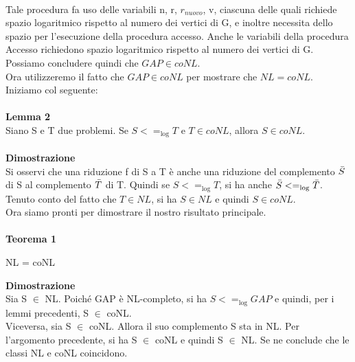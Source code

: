 \\Tale procedura fa uso delle variabili n, r, $r_{nuovo}$, v, ciascuna delle quali richiede spazio logaritmico rispetto al numero dei vertici di G, e inoltre necessita dello spazio per l’esecuzione della procedura accesso. Anche le variabili della procedura Accesso richiedono spazio logaritmico rispetto al numero dei vertici di G. Possiamo concludere quindi che $GAP \in coNL$.
\\Ora utilizzeremo il fatto che $GAP \in coNL$ per mostrare che $NL = coNL$. \\Iniziamo col seguente:\\\\
\textbf{Lemma 2}\\
Siano S e T due problemi. Se $S <=_{\log} T$ e $T \in coNL$, allora $S \in coNL$.\\\\
\textbf{Dimostrazione}\\    
Si osservi che una riduzione f di S a T è anche una riduzione del complemento $\Bar{S}$ di S al complemento $\Bar{T}$ di T. Quindi se $S <=_{\log}T$, si ha anche $\Bar{S} <=_{\log}\Bar{T}$.
\\Tenuto conto del fatto che $T \in NL$, si ha $S \in NL$ e quindi $S \in coNL$.
\\Ora siamo pronti per dimostrare il nostro risultato principale.\\\\
\textbf{Teorema 1}
\begin{center}
    NL = coNL
\end{center}
\textbf{Dimostrazione}\\
Sia S $\in$ NL. Poiché GAP è NL-completo, si ha $S <=_{\log} GAP$ e quindi, per i lemmi precedenti, S $\in$ coNL.
\\Viceversa, sia S $\in$ coNL. Allora il suo complemento S sta in NL. Per l’argomento precedente, si ha S $\in$ coNL e quindi S $\in$ NL. Se ne conclude che le classi NL e coNL coincidono.